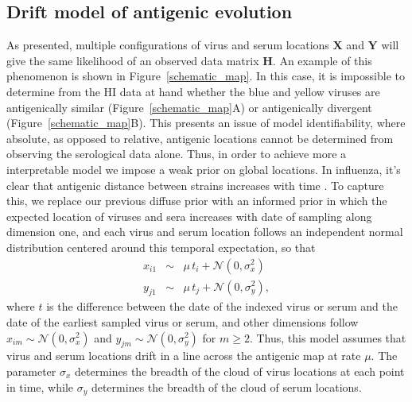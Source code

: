 \documentclass[11pt,oneside,letterpaper]{article}
\newcommand{\viruses}{\mathbf{X}}					%
\newcommand{\sera}{\mathbf{Y}}						%
\newcommand{\virussd}{\sigma_x}						%
\newcommand{\serumsd}{\sigma_y}						%
\newcommand{\drift}{\mu}							%
\newcommand{\normal}{\mathcal{N}}					%
\begin{document}
\subsection*{Drift model of antigenic evolution}

As presented, multiple configurations of virus and serum locations $\viruses$ and $\sera$ will give the same likelihood of an observed data matrix $\mathbf{H}$.
An example of this phenomenon is shown in Figure~\ref{schematic_map}.
In this case, it is impossible to determine from the HI data at hand whether the blue and yellow viruses are antigenically similar (Figure~\ref{schematic_map}A) or antigenically divergent (Figure~\ref{schematic_map}B). 
This presents an issue of model identifiability, where absolute, as opposed to relative, antigenic locations cannot be determined from observing the serological data alone.
Thus, in order to achieve more a interpretable model we impose a weak prior on global locations.
In influenza, it's clear that antigenic distance between strains increases with time \cite{Smith04,Cai10}.
To capture this, we replace our previous diffuse prior with an informed prior in which the expected location of viruses and sera increases with date of sampling along dimension one, and each virus and serum location follows an independent normal distribution centered around this temporal expectation, so that
\begin{eqnarray}
	x_{i1} &\sim& \drift \, t_i + \normal(0, \virussd^2) \nonumber \\
	y_{j1} &\sim& \drift \, t_j + \normal(0, \serumsd^2),
\end{eqnarray}
where $t$ is the difference between the date of the indexed virus or serum and the date of the earliest sampled virus or serum, and other dimensions follow $x_{im} \sim \normal(0, \virussd^2)$ and $y_{jm} \sim \normal(0, \serumsd^2)$ for $m\ge2$.
Thus, this model assumes that virus and serum locations drift in a line across the antigenic map at rate $\drift$.
The parameter $\virussd$ determines the breadth of the cloud of virus locations at each point in time, while $\serumsd$ determines the breadth of the cloud of serum locations.
\end{document}
